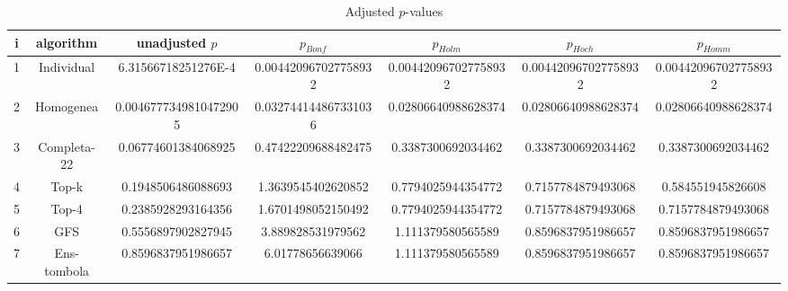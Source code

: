 \documentclass[a4paper,10pt]{article}
\begin{document}
\begin{landscape}
\begin{table}[!htp]
\centering\tiny
\caption{Adjusted $p$-values}
\begin{tabular}{ccccccc}
i&algorithm&unadjusted $p$&$p_{Bonf}$&$p_{Holm}$&$p_{Hoch}$&$p_{Homm}$\\
\hline
1&Individual&6.31566718251276E-4&0.004420967027758932&0.004420967027758932&0.004420967027758932&0.004420967027758932\\
2&Homogenea&0.0046777349810472905&0.032744144867331036&0.02806640988628374&0.02806640988628374&0.02806640988628374\\
3&Completa-22&0.06774601384068925&0.47422209688482475&0.3387300692034462&0.3387300692034462&0.3387300692034462\\
4&Top-k&0.1948506486088693&1.3639545402620852&0.7794025944354772&0.7157784879493068&0.584551945826608\\
5&Top-4&0.2385928293164356&1.6701498052150492&0.7794025944354772&0.7157784879493068&0.7157784879493068\\
6&GFS&0.5556897902827945&3.889828531979562&1.111379580565589&0.8596837951986657&0.8596837951986657\\
7&Ens-tombola&0.8596837951986657&6.01778656639066&1.111379580565589&0.8596837951986657&0.8596837951986657\\
\hline
\end{tabular}
\end{table}


\end{landscape}
\end{document}
